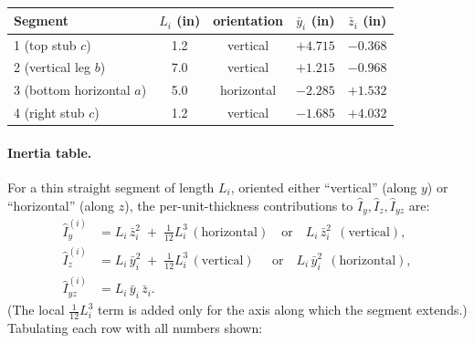 \documentclass[11pt]{article}
\begin{document}
\begin{tabular}{lcccc}
\toprule
Segment & $L_i$ (in) & orientation & $\bar y_i$ (in) & $\bar z_i$ (in)\\
\midrule
1 (top stub $c$)        & 1.2 & vertical   & $+4.715$ & $-0.368$\\
2 (vertical leg $b$)    & 7.0 & vertical   & $+1.215$ & $-0.968$\\
3 (bottom horizontal $a$) & 5.0 & horizontal & $-2.285$ & $+1.532$\\
4 (right stub $c$)      & 1.2 & vertical   & $-1.685$ & $+4.032$\\
\bottomrule
\end{tabular}

\paragraph{Inertia table.}
For a thin straight segment of length $L_i$, oriented either ``vertical'' (along $y$) or ``horizontal'' (along $z$), the per-unit-thickness contributions to $\hat I_y, \hat I_z, \hat I_{yz}$ are:
\begin{align*}
\hat I_y^{(i)} &= L_i\,\bar z_i^2 \;+\; \tfrac{1}{12} L_i^3\,(\text{horizontal})\quad\text{or}\quad L_i\,\bar z_i^2\ \ (\text{vertical}),\\
\hat I_z^{(i)} &= L_i\,\bar y_i^2 \;+\; \tfrac{1}{12} L_i^3\,(\text{vertical})\quad\ \,\text{or}\quad L_i\,\bar y_i^2\ \ (\text{horizontal}),\\
\hat I_{yz}^{(i)} &= L_i\,\bar y_i\,\bar z_i.
\end{align*}
(The local $\tfrac{1}{12} L_i^3$ term is added only for the axis along which the segment extends.) Tabulating each row with all numbers shown:
\end{document}
